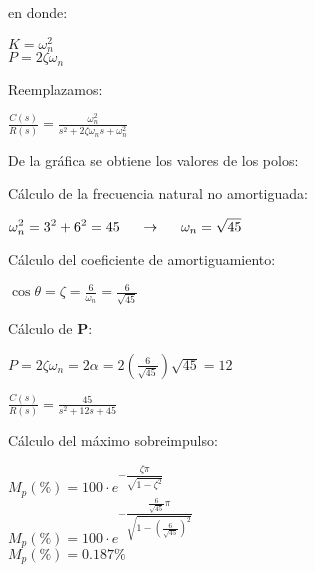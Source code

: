 \documentclass[12pt]{article}
\begin{document}
\begin{enumerate}
      en donde:

      \( \displaystyle K = \omega_{n}^{2}\)\\
      \( \displaystyle P = 2\zeta \omega_{n}\)

      Reemplazamos:

      \( \displaystyle \frac{C(s)}{R(s)} = \frac{\omega_{n}^{2}}{s^2 + 2\zeta \omega_{n} s + \omega_{n}^{2}} \)

      De la gr\'afica se obtiene los valores de los polos:

      C\'alculo de la frecuencia natural no amortiguada:

      \( \displaystyle \omega_n^{2}= 3^2 + 6^2 = 45 \hspace{5mm} \rightarrow \hspace{5mm} \omega_{n}=\sqrt{45} \)

      C\'alculo del coeficiente de amortiguamiento:

      \( \displaystyle \cos{\theta} = \zeta = \frac{6}{\omega_{n}} = \frac{6}{\sqrt{45}} \)

      C\'alculo de \textbf{P}:

      \( \displaystyle P = 2\zeta \omega_{n} = 2 \alpha =
      2 \left ( \frac{6}{\sqrt{45}} \right)\sqrt{45} = 12 \)

      \vspace{1cm}


    \vspace{1cm}


    \( \displaystyle \frac{C(s)}{R(s)} = \frac{45}{s^2 + 12s + 45} \)

    \vspace{1cm}
    C\'alculo del m\'aximo sobreimpulso:

    \( \displaystyle M_p(\%) = 100\cdot e^{- \dfrac{\zeta \pi}{\sqrt{1 - \zeta^{2}}}} \)\\
    \( \displaystyle M_p(\%) = 100\cdot e^{- \dfrac{\tfrac{6}{\sqrt{45}} \pi}{\sqrt{1 - \left ( \tfrac{6}{\sqrt{45}} \right )^{2}}}} \)\\
    \( \displaystyle M_p(\%) = 0.187 \% \)\\


\end{enumerate}
\end{document}
